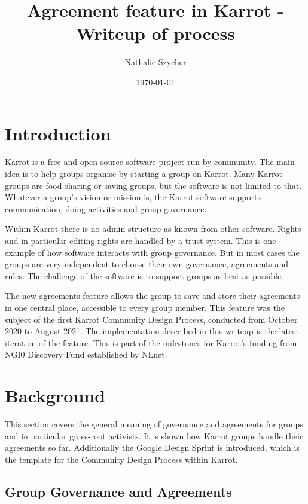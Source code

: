 \documentclass[
	a4paper,%
	11pt,%
	]{article}
\begin{document}
\title{Agreement feature in Karrot - Writeup of process}

\author{Nathalie Szycher}
\date{\today}

\maketitle
\tableofcontents


\section{Introduction}

Karrot is a free and open-source software project run by community. The main idea is to help groups organise by starting a group on Karrot. Many Karrot groups are food sharing or saving groups, but the software is not limited to that. Whatever a group's vision or mission is, the Karrot software supports communication, doing activities and group governance.

Within Karrot there is no admin structure as known from other software. Rights and in particular editing rights are handled by a trust system. This is one example of how software interacts with group governance. But in most cases the groups are very independent to choose their own governance, agreements and rules. The challenge of the software is to support groups as best as possible.

The new agreements feature allows the group to save and store their agreements in one central place, accessible to every group member. This feature was the subject of the first Karrot Community Design Process, conducted from October 2020 to August 2021. The implementation described in this writeup is the latest iteration of the feature. This is part of the milestones for Karrot's funding from NGI0 Discovery Fund established by NLnet.



\section{Background}

This section covers the general meaning of governance and agreements for groups and in particular grass-root activists. It is shown how Karrot groups handle their agreements so far. Additionally the Google Design Sprint is introduced, which is the template for the Community Design Process within Karrot.

\subsection{Group Governance and Agreements}
\end{document}
